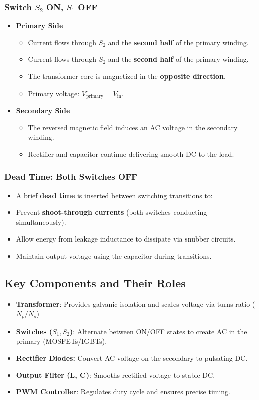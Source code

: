 \subsubsection*{Switch \(S_2\) ON, \(S_1\) OFF}
\begin{itemize}
    \item \textbf{Primary Side}
    \begin{itemize}
        \item Current flows through \(S_2\) and the \textbf{second half} of the primary winding.
        \item Current flows through \(S_2\) and the \textbf{second half} of the primary winding.
        \item The transformer core is magnetized in the \textbf{opposite direction}.
        \item Primary voltage: \(V_{\text{primary}} = V_{\text{in}}\).
    \end{itemize}
    \item \textbf{Secondary Side}
    \begin{itemize}
        \item The reversed magnetic field induces an AC voltage in the secondary winding.
        \item  Rectifier and capacitor continue delivering smooth DC to the load.
    \end{itemize}
\end{itemize}
\subsubsection*{Dead Time: Both Switches OFF}
\begin{itemize}
    \item A brief \textbf{dead time} is inserted between switching transitions to:
    \item Prevent \textbf{shoot-through currents} (both switches conducting simultaneously).
    \item Allow energy from leakage inductance to dissipate via snubber circuits.
    \item Maintain output voltage using the capacitor during transitions.
\end{itemize}    
\subsection{Key Components and Their Roles}
\begin{itemize}
    \item \textbf{Transformer}: Provides galvanic isolation and scales voltage via turns ratio (\(N_p/N_s\))
    \item \textbf{Switches (\(S_1, S_2\))}:  Alternate between ON/OFF states to create AC in the primary (MOSFETs/IGBTs).
    \item \textbf{Rectifier Diodes:} Convert AC voltage on the secondary to pulsating DC.
    \item \textbf{Output Filter (L, C)}: Smooths rectified voltage to stable DC.
    \item \textbf{PWM Controller}: Regulates duty cycle and ensures precise timing.
\end{itemize}